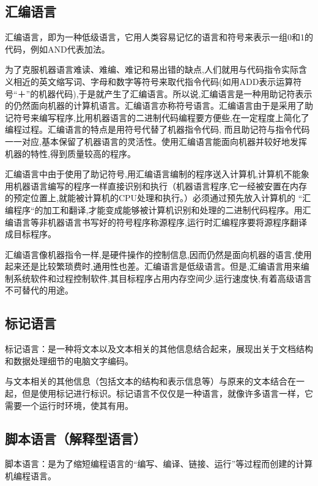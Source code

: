 \subsection{汇编语言}\label{sub_CpLgg_2}

汇编语言，即为一种低级语言，它用人类容易记忆的语言和符号来表示一组0和1的代码，例如AND代表加法。

为了克服机器语言难读、难编、难记和易出错的缺点,人们就用与代码指令实际含义相近的英文缩写词、字母和数字等符号来取代指令代码(如用ADD表示运算符号“＋”的机器代码),于是就产生了汇编语言。所以说,汇编语言是一种用助记符表示的仍然面向机器的计算机语言。汇编语言亦称符号语言。汇编语言由于是采用了助记符号来编写程序,比用机器语言的二进制代码编程要方便些,在一定程度上简化了编程过程。汇编语言的特点是用符号代替了机器指令代码, 而且助记符与指令代码一一对应,基本保留了机器语言的灵活性。使用汇编语言能面向机器并较好地发挥机器的特性,得到质量较高的程序。

汇编语言中由于使用了助记符号,用汇编语言编制的程序送入计算机,计算机不能象用机器语言编写的程序一样直接识别和执行（机器语言程序,它一经被安置在内存的预定位置上,就能被计算机的CPU处理和执行。）必须通过预先放入计算机的 “汇编程序“的加工和翻译,才能变成能够被计算机识别和处理的二进制代码程序。用汇编语言等非机器语言书写好的符号程序称源程序,运行时汇编程序要将源程序翻译成目标程序。

汇编语言像机器指令一样,是硬件操作的控制信息,因而仍然是面向机器的语言,使用起来还是比较繁琐费时,通用性也差。汇编语言是低级语言。但是,汇编语言用来编制系统软件和过程控制软件,其目标程序占用内存空间少,运行速度快,有着高级语言不可替代的用途。

\subsection{标记语言}\label{sub_CpLgg_3}

标记语言：是一种将文本以及文本相关的其他信息结合起来，展现出关于文档结构和数据处理细节的电脑文字编码。

与文本相关的其他信息（包括文本的结构和表示信息等）与原来的文本结合在一起，但是使用标记进行标识。标记语言不仅仅是一种语言，就像许多语言一样，它需要一个运行时环境，使其有用。

\subsection{脚本语言（解释型语言）}\label{sub_CpLgg_4}

脚本语言：是为了缩短编程语言的“编写、编译、链接、运行”等过程而创建的计算机编程语言。

